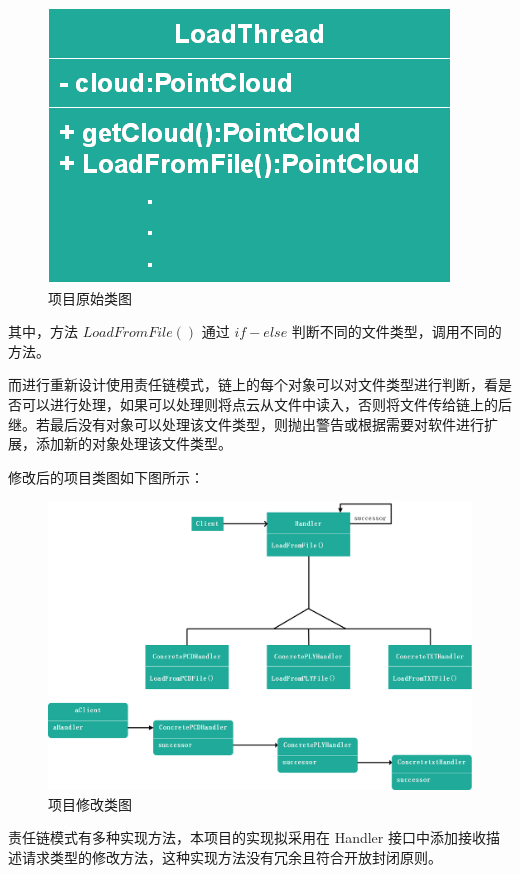 \documentclass[article]{BJTU-thesis}
\begin{document}
		\begin{figure}[!htbp]
		\centering
		\includegraphics[scale=0.5]{21.png}
		\caption{项目原始类图}
	\end{figure}

	其中，方法 $LoadFromFile()$ 通过 $if-else$ 判断不同的文件类型，调用不同的方法。

	而进行重新设计使用责任链模式，链上的每个对象可以对文件类型进行判断，看是否可以进行处理，如果可以处理则将点云从文件中读入，否则将文件传给链上的后继。若最后没有对象可以处理该文件类型，则抛出警告或根据需要对软件进行扩展，添加新的对象处理该文件类型。
	
	修改后的项目类图如下图所示：
		\begin{figure}[!htbp]
		\centering
		\includegraphics[scale=0.4]{22.png}
		\caption{项目修改类图}
	\end{figure}

	责任链模式有多种实现方法，本项目的实现拟采用在 Handler 接口中添加接收描述请求类型的修改方法，这种实现方法没有冗余且符合开放封闭原则。
	
\end{document}
